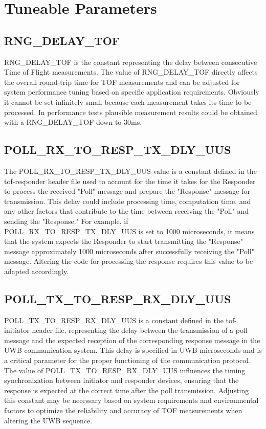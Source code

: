 \chapter{Tuneable Parameters}
\label{chap:Tuneable Parameters}


\section{RNG\_DELAY\_TOF}
RNG\_DELAY\_TOF is the constant representing the delay between consecutive Time of Flight measurements. 
The value of RNG\_DELAY\_TOF directly affects the overall round-trip time for TOF measurements and can be adjusted for system performance tuning based on specific application requirements. 
Obviously it cannot be set infinitely small because each measurement takes its time to be processed. 
In performance tests plausible measurement results could be obtained with a RNG\_DELAY\_TOF down to 30ms. 

\section{POLL\_RX\_TO\_RESP\_TX\_DLY\_UUS}
The POLL\_RX\_TO\_RESP\_TX\_DLY\_UUS value is a constant defined in the tof-responder header file used to account for the time it takes for the Responder to process the received "Poll" message and prepare the "Response" message for transmission. 
This delay could include processing time, computation time, and any other factors that contribute to the time between receiving the "Poll" and sending the "Response."
\vspace{4pt}
\newline
For example, if POLL\_RX\_TO\_RESP\_TX\_DLY\_UUS is set to 1000 microseconds, it means that the system expects the Responder to start transmitting the "Response" message approximately 1000 microseconds after successfully receiving the "Poll" message.
\vspace{4pt}
\newline
Altering the code for processing the response requires this value to be adapted accordingly. 

\section{POLL\_TX\_TO\_RESP\_RX\_DLY\_UUS}
POLL\_TX\_TO\_RESP\_RX\_DLY\_UUS is a constant defined in the tof-initiator header file, representing the delay between the transmission of a poll message and the expected reception of the corresponding response message in the UWB communication system. 
This delay is specified in UWB microseconds and is a critical parameter for the proper functioning of the communication protocol. 
The value of POLL\_TX\_TO\_RESP\_RX\_DLY\_UUS influences the timing synchronization between initiator and responder devices, ensuring that the response is expected at the correct time after the poll transmission. 
\vspace{4pt}
\newline
Adjusting this constant may be necessary based on system requirements and environmental factors to optimize the reliability and accuracy of TOF measurements when altering the UWB sequence.


